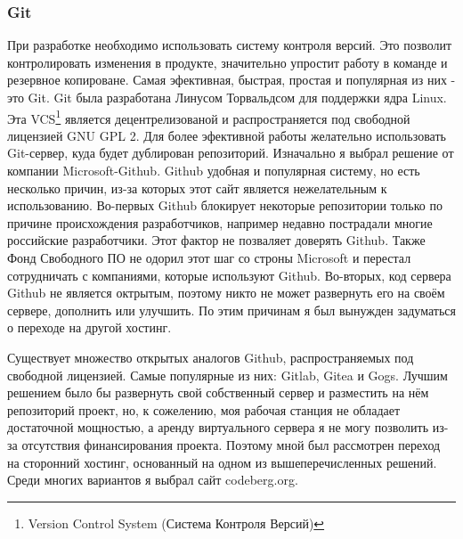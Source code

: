 \documentclass[a4paper, 14pt]{extarticle}
\begin{document}
\subsubsection{Git}
При разработке необходимо использовать систему контроля версий.
Это позволит контролировать изменения в продукте, значительно упростит
работу в команде и резервное копироване. Самая эфективная, быстрая, простая
и популярная из них - это Git. Git была разработана Линусом Торвальдсом для
поддержки ядра Linux. Эта VCS\footnote{
    Version Control System (Система Контроля Версий)
} является децентрелизованой и распространяется под свободной лицензией
GNU GPL 2. Для более эфективной работы желательно использовать Git-сервер,
куда будет дублирован репозиторий. Изначально я выбрал решение от компании
Microsoft-Github. Github удобная и популярная систему,
но есть несколько причин, из-за которых этот сайт является нежелательным
к использованию. Во-первых Github блокирует некоторые репозитории только
по причине происхождения разработчиков, например недавно пострадали многие
российские разработчики. Этот фактор не позваляет доверять Github.
Также Фонд Свободного ПО не одорил этот шаг со строны Microsoft и перестал
сотрудничать с компаниями, которые используют Github. Во-вторых, код сервера
Github не является октрытым, поэтому никто не может развернуть его на
своём сервере, дополнить или улучшить. По этим причинам я был вынужден
задуматься о переходе на другой хостинг.

Существует множество открытых аналогов Github, распространяемых под
свободной лицензией. Самые популярные из них: Gitlab, Gitea и Gogs.
Лучшим решением было бы развернуть свой собственный сервер и разместить на нём
репозиторий проект, но, к сожелению, моя рабочая станция не обладает
достаточной мощностью, а аренду виртуального сервера я не могу позволить
из-за отсутствия финансирования проекта. Поэтому мной был рассмотрен переход
на сторонний хостинг, основанный на одном из вышеперечисленных решений.
Среди многих вариантов я выбрал сайт codeberg.org.
\end{document}
